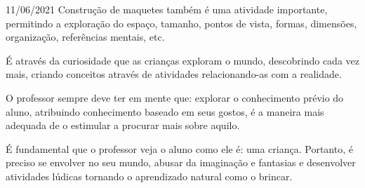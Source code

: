 \documentclass{SchoolBook}
\begin{document}
\begin{day}{11/06/2021}
         Construção de maquetes também é uma atividade importante, permitindo a exploração do espaço, tamanho, pontos de vista, formas, dimensões, organização, referências mentais, etc.
         
         É através da curiosidade que as crianças exploram o mundo, descobrindo cada vez mais, criando conceitos através de atividades relacionando-as com a realidade.
         
         O professor sempre deve ter em mente que: explorar o conhecimento prévio do aluno, atribuindo conhecimento baseado em seus gostos, é a maneira mais adequada de o estimular a procurar mais sobre aquilo.
         
         É fundamental que o professor veja o aluno como ele é: uma criança. Portanto, é preciso se envolver no seu mundo, abusar da imaginação e fantasias e desenvolver atividades lúdicas tornando o aprendizado natural como o brincar.
    \end{day}
    
\end{document}
